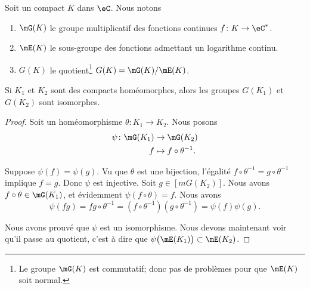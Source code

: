 \begin{definition}
    Soit un compact \( K\) dans \( \eC\). Nous notons
    \begin{enumerate}
        \item
            \( \mG(K)\) le groupe multiplicatif des fonctions continues \( f\colon K\to \eC^*\).
        \item
            \( \mE(K)\) le sous-groupe des fonctions admettant un logarithme continu.
        \item
            \( G(K)\) le quotient\footnote{Le groupe \( \mG(K)\) est commutatif; donc pas de problèmes pour que \( \mE(K)\) soit normal.} \( G(K)=\mG(K)/\mE(K)\).
    \end{enumerate}
\end{definition}

\begin{lemma}     \label{LEMooHEOWooHTtHsJ}
    Si \( K_1\) et \( K_2\) sont des compacts homéomorphes, alors les groupes \( G(K_1)\) et \( G(K_2)\) sont isomorphes.
\end{lemma}

\begin{proof}
    Soit un homéomorphisme \( \theta\colon K_1\to K_2\). Nous posons
    \begin{equation}
        \begin{aligned}
            \psi\colon \mG(K_1)&\to \mG(K_2)  \\
            f&\mapsto f\circ \theta^{-1}. 
        \end{aligned}
    \end{equation}
    \begin{subproof}
        \spitem[Injective]
        Suppose \( \psi(f)=\psi(g)\). Vu que \( \theta\) est une bijection, l'égalité \( f\circ \theta^{-1}=g\circ\theta^{-1}\) implique \( f=g\). Donc \( \psi\) est injective.
        \spitem[Surjective]
        Soit \( g\in[mG(K_2)]\). Nous avons \( f\circ\theta\in\mG(K_1)\), et évidemment \( \psi(f\circ\theta)=f\).
        \spitem[Morphisme]
         Nous avons 
         \begin{equation}
             \psi(fg)=fg\circ\theta^{-1}=(f\circ\theta^{-1})(g\circ\theta^{-1})=\psi(f)\psi(g).
         \end{equation}
    \end{subproof}
    Nous avons prouvé que \( \psi\) est un isomorphisme. Nous devons maintenant voir qu'il passe au quotient, c'est à dire que \( \psi\big( \mE(K_1) \big)\subset\mE(K_2)\).
\end{proof}

